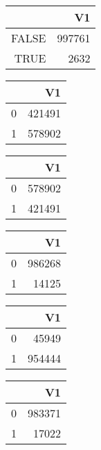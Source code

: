 \bigskip\bigskip
\centering
\begin{tabular}{rr}
  \hline
 & V1 \\ 
  \hline
FALSE & 997761 \\ 
  TRUE & 2632 \\ 
   \hline
\end{tabular}

\bigskip\bigskip
\centering
\begin{tabular}{rr}
  \hline
 & V1 \\ 
  \hline
0 & 421491 \\ 
  1 & 578902 \\ 
   \hline
\end{tabular}

\bigskip\bigskip
\centering
\begin{tabular}{rr}
  \hline
 & V1 \\ 
  \hline
0 & 578902 \\ 
  1 & 421491 \\ 
   \hline
\end{tabular}

\bigskip\bigskip
\centering
\begin{tabular}{rr}
  \hline
 & V1 \\ 
  \hline
0 & 986268 \\ 
  1 & 14125 \\ 
   \hline
\end{tabular}

\bigskip\bigskip
\centering
\begin{tabular}{rr}
  \hline
 & V1 \\ 
  \hline
0 & 45949 \\ 
  1 & 954444 \\ 
   \hline
\end{tabular}

\bigskip\bigskip
\centering
\begin{tabular}{rr}
  \hline
 & V1 \\ 
  \hline
0 & 983371 \\ 
  1 & 17022 \\ 
   \hline
\end{tabular}

